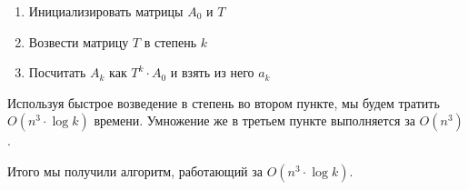 \begin{enumerate}
    \item Инициализировать матрицы $A_0$ и $T$
    \item Возвести матрицу $T$ в степень $k$
    \item Посчитать $A_k$ как $T^k \cdot A_0$ и взять из него $a_k$
\end{enumerate}

Используя быстрое возведение в степень во втором пункте, мы будем тратить $O(n^3 \cdot \log k)$ времени. Умножение же в третьем пункте выполняется за $O(n^3)$.

Итого мы получили алгоритм, работающий за $O(n^3 \cdot \log k)$.

\pagebreak